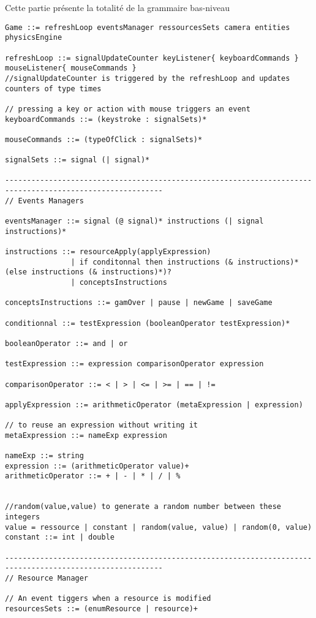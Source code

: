 Cette partie présente la totalité de la grammaire bas-niveau

\begin{lstlisting}[language=Grammar]
 Game ::= refreshLoop eventsManager ressourcesSets camera entities physicsEngine

refreshLoop ::= signalUpdateCounter keyListener{ keyboardCommands } mouseListener{ mouseCommands }
//signalUpdateCounter is triggered by the refreshLoop and updates counters of type times

// pressing a key or action with mouse triggers an event
keyboardCommands ::= (keystroke : signalSets)*

mouseCommands ::= (typeOfClick : signalSets)*

signalSets ::= signal (| signal)*

----------------------------------------------------------------------------------------------------------
// Events Managers

eventsManager ::= signal (@ signal)* instructions (| signal instructions)*

instructions ::= resourceApply(applyExpression) 
               | if conditonnal then instructions (& instructions)* (else instructions (& instructions)*)? 
               | conceptsInstructions

conceptsInstructions ::= gamOver | pause | newGame | saveGame

conditionnal ::= testExpression (booleanOperator testExpression)*

booleanOperator ::= and | or

testExpression ::= expression comparisonOperator expression

comparisonOperator ::= < | > | <= | >= | == | !=

applyExpression ::= arithmeticOperator (metaExpression | expression)

// to reuse an expression without writing it
metaExpression ::= nameExp expression

nameExp ::= string
expression ::= (arithmeticOperator value)+
arithmeticOperator ::= + | - | * | / | %


//random(value,value) to generate a random number between these integers
value = ressource | constant | random(value, value) | random(0, value)
constant ::= int | double

----------------------------------------------------------------------------------------------------------
// Resource Manager

// An event tiggers when a resource is modified
resourcesSets ::= (enumResource | resource)+



\end{lstlisting}
